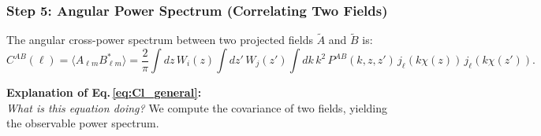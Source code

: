 \subsubsection{Step 5: Angular Power Spectrum (Correlating Two Fields)}

The angular cross-power spectrum between two projected fields $\tilde{A}$ and $\tilde{B}$ is:
\begin{equation}
    C^{AB}(\ell) = \langle A_{\ell m} B^*_{\ell m} \rangle =
    \frac{2}{\pi}
    \int dz\, W_i(z) \int dz'\, W_j(z')
    \int dk\, k^2\, P^{AB}(k,z,z')\,
    j_\ell(k\chi(z))\,j_\ell(k\chi(z')).
    \label{eq:Cl_general}
\end{equation}

\noindent\textbf{\large Explanation of Eq.\,\eqref{eq:Cl_general}:}\\
\textit{What is this equation doing?} We compute the covariance of two fields, yielding the observable power spectrum.
